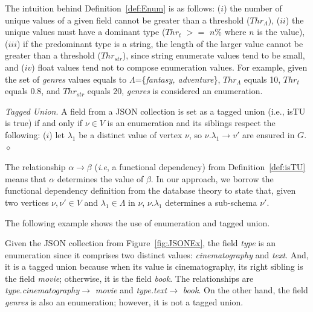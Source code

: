 The intuition behind Definition~\ref{def:Enum} is as follows: ($i$) the number of unique values of a given field cannot be greater than a threshold ($Thr_{\Lambda}$), ($ii$) the unique values must have a dominant type ($Thr_t$ $>=$ $n$\% where $n$ is the value), ($iii$) if the predominant type is a string, the length of the larger value cannot be greater than a threshold ($Thr_{str}$), since string enumerate values tend to be small, and ($iv$) float values tend not to compose enumeration values. 
For example, given the set of \textit{genres} values equals to \(\Lambda\)=\{\textit{fantasy, adventure}\},  $Thr_{\Lambda}$ equals 10, $Thr_{t}$ equals 0.8, and $Thr_{str}$ equals 20, \textit{genres} is considered an enumeration.

\begin{definition} {\it Tagged Union}.
A field from a JSON collection is set as a tagged union (i.e., isTU is true) if and only if $\nu \in V$ is an enumeration and its siblings respect the following: ($i$) let \(\lambda_1\) be a distinct value of vertex \(\nu\), so \(\nu.\lambda_1 \rightarrow v' \) are ensured in $G$. 
   \hfill{$\diamond$}
   \label{def:isTU}   
\end{definition}

The relationship \(\alpha \rightarrow \beta\) (\textit{i.e}, a functional dependency) from Definition~\ref{def:isTU} means that $\alpha$ determines the value of $\beta$. 
In our approach, we borrow the functional dependency definition from the database theory to state that, given two vertices \(\nu, \nu' \in V\) and $\lambda_1 \in \Lambda$ in $\nu$, \(\nu.\lambda_1\)  determines a sub-schema $\nu'$.

The following example shows the use of enumeration and tagged union.

\begin{example}
Given the JSON collection from Figure~\ref{fig:JSONEx}, the field \emph{type} is an enumeration since it comprises two distinct values: \emph{cinematography} and \emph{text}. And, it is a tagged union because when its value is cinematography, its right sibling is the field \emph{movie}; otherwise, it is the field \emph{book}. The relationships are \emph{type.cinematography}$\rightarrow$ \emph{movie} and \emph{type.text}$\rightarrow$ \emph{book}. 
On the other hand, the field \emph{genres} is also an enumeration; however, it is not a tagged union. 

\end{example}

